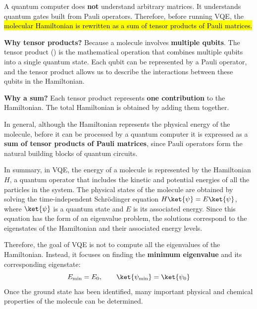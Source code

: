\highspace
\begin{deepeningbox}
    A quantum computer does \textbf{not} understand arbitrary matrices. It understands quantum gates built from Pauli operators. Therefore, before running VQE, the \hl{molecular Hamiltonian is rewritten as a sum of tensor products of Pauli matrices.}

    \highspace
    \textcolor{Green3}{ \textbf{Why tensor products?}} Because a molecule involves \textbf{multiple qubits}. The tensor product () is the mathematical operation that combines multiple qubits into a single quantum state. Each qubit can be represented by a Pauli operator, and the tensor product allows us to describe the interactions between these qubits in the Hamiltonian.

    \highspace
    \textcolor{Green3}{ \textbf{Why a sum?}} Each tensor product represents \textbf{one contribution} to the Hamiltonian. The total Hamiltonian is obtained by adding them together.

    \highspace
    In general, although the Hamiltonian represents the physical energy of the molecule, before it can be processed by a quantum computer it is expressed as a \textbf{sum of tensor products of Pauli matrices}, since Pauli operators form the natural building blocks of quantum circuits.
\end{deepeningbox}

\highspace
In summary, in VQE, the energy of a molecule is represented by the Hamiltonian $H$, a quantum operator that includes the kinetic and potential energies of all the particles in the system. The physical states of the molecule are obtained by solving the time-independent Schrödinger equation $H\ket{\psi} = E\ket{\psi}$, where $\ket{\psi}$ is a quantum state and $E$ is its associated energy. Since this equation has the form of an eigenvalue problem, the solutions correspond to the eigenstates of the Hamiltonian and their associated energy levels.

\highspace
Therefore, the goal of VQE is not to compute all the eigenvalues of the Hamiltonian. Instead, it focuses on finding the \textbf{minimum eigenvalue} and its corresponding eigenstate:
\begin{equation*}
    E_{\min}=E_0,
    \qquad
    \ket{\psi_{\min}}=\ket{\psi_0}
\end{equation*}
Once the ground state has been identified, many important physical and chemical properties of the molecule can be determined.